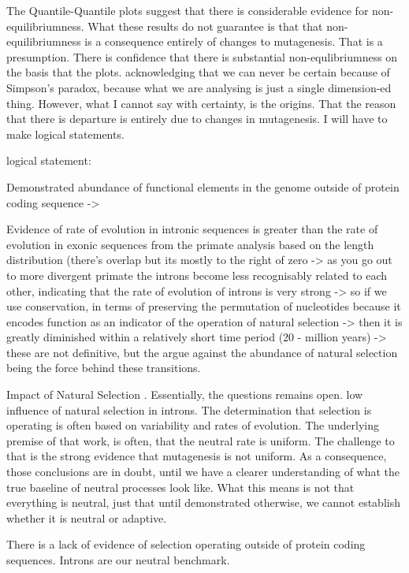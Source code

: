 The Quantile-Quantile plots suggest that there is considerable evidence for non-equilibriumness. What these results do not guarantee is that that non-equilibriumness is a consequence entirely of changes to mutagenesis. That is a presumption. There is confidence that there is substantial non-equlibriumness on the basis that the plots. acknowledging that we can never be certain because of Simpson's paradox, because what we are analysing is just a single dimension-ed thing. However, what I cannot say with certainty, is the origins. That the reason that there is departure is entirely due to changes in mutagenesis. I will have to make logical statements. 

logical statement: 

Demonstrated abundance of functional elements in the genome outside of protein coding sequence ->

Evidence of rate of evolution in intronic sequences is greater than the rate of evolution in exonic sequences from the primate analysis based on the length distribution (there's overlap but its mostly to the right of zero -> as you go out to more divergent primate the introns become less recognisably related to each other, indicating that the rate of evolution of introns is very strong -> so if we use conservation, in terms of preserving the permutation of nucleotides because it encodes function as an indicator of the operation of natural selection -> then it is greatly diminished within a relatively short time period (20 - million years) -> these are not definitive, but the argue against the abundance of natural selection being the force behind these transitions.

Impact of Natural Selection \cite{Graur2013OnENCODE}. Essentially, the questions remains open. 
low influence of natural selection in introns. 
The determination that selection is operating is often based on variability and rates of evolution. The underlying premise of that work, is often, that the neutral rate is uniform. The challenge to that is the strong evidence that mutagenesis is not uniform. As a consequence, those conclusions are in doubt, until we have a clearer understanding of what the true baseline of neutral processes look like. What this means is not that everything is neutral, just that until demonstrated otherwise, we cannot establish whether it is neutral or adaptive. 

There is a lack of evidence of selection operating outside of protein coding sequences. 
Introns are our neutral benchmark. 

